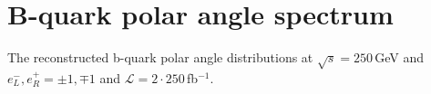 

\section*{B-quark polar angle spectrum}

The reconstructed b-quark polar angle distributions at $\sqrt{s} = 250$\,GeV and $e^-_L, e^+_R = \pm1, \mp1$ and $\mathcal{L} = 2\cdot 250 $\,fb$^{-1}$.
